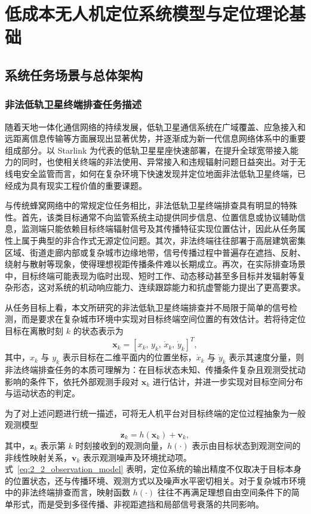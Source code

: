 \chapter{低成本无人机定位系统模型与定位理论基础}
\label{ch:fundamentals}

\section{系统任务场景与总体架构}
\label{sec:2_1}

\subsection{非法低轨卫星终端排查任务描述}
\label{subsec:2_1_1}

随着天地一体化通信网络的持续发展，低轨卫星通信系统在广域覆盖、应急接入和远距离信息传输等方面展现出显著优势，并逐渐成为新一代信息网络体系中的重要组成部分。以 Starlink 为代表的低轨卫星星座快速部署，在提升全球宽带接入能力的同时，也使相关终端的非法使用、异常接入和违规辐射问题日益突出。对于无线电安全监管而言，如何在复杂环境下快速发现并定位地面非法低轨卫星终端，已经成为具有现实工程价值的重要课题。

与传统蜂窝网络中的常规定位任务相比，非法低轨卫星终端排查具有明显的特殊性。首先，该类目标通常不向监管系统主动提供同步信息、位置信息或协议辅助信息，监测端只能依赖目标终端辐射信号及其传播特征实现位置估计，因此从任务属性上属于典型的非合作式无源定位问题。其次，非法终端往往部署于高层建筑密集区域、街道走廊内部或复杂城市边缘地带，信号传播过程中普遍存在遮挡、反射、绕射与散射等现象，使得理想视距传播条件难以长期成立。再次，在实际排查场景中，目标终端可能表现为临时出现、短时工作、动态移动甚至多目标并发辐射等复杂形态，这对系统的机动响应能力、连续跟踪能力和抗虚警能力提出了更高要求。

从任务目标上看，本文所研究的非法低轨卫星终端排查并不局限于简单的信号检测，而是要求在复杂城市环境中实现对目标终端空间位置的有效估计。若将待定位目标在离散时刻 $k$ 的状态表示为
\begin{equation}
\mathbf{x}_{k}
=
\left[
x_k,\,
y_k,\,
\dot{x}_k,\,
\dot{y}_k
\right]^T,
\label{eq:2_1_target_state}
\end{equation}
其中，$x_k$ 与 $y_k$ 表示目标在二维平面内的位置坐标，$\dot{x}_k$ 与 $\dot{y}_k$ 表示其速度分量，则非法终端排查任务的本质可理解为：在目标状态未知、传播条件复杂且观测受扰动影响的条件下，依托外部观测手段对 $\mathbf{x}_k$ 进行估计，并进一步实现对目标空间分布与运动状态的判定。

为了对上述问题进行统一描述，可将无人机平台对目标终端的定位过程抽象为一般观测模型
\begin{equation}
\mathbf{z}_{k}
=
h(\mathbf{x}_{k})+\mathbf{v}_{k},
\label{eq:2_2_observation_model}
\end{equation}
其中，$\mathbf{z}_k$ 表示第 $k$ 时刻接收到的观测向量，$h(\cdot)$ 表示由目标状态到观测空间的非线性映射关系，$\mathbf{v}_k$ 表示观测噪声及环境扰动项。式~\eqref{eq:2_2_observation_model} 表明，定位系统的输出精度不仅取决于目标本身的位置状态，还与传播环境、观测方式以及噪声水平密切相关。对于复杂城市环境中的非法终端排查而言，映射函数 $h(\cdot)$ 往往不再满足理想自由空间条件下的简单形式，而是受到多径传播、非视距遮挡和局部信号衰落的共同影响。

